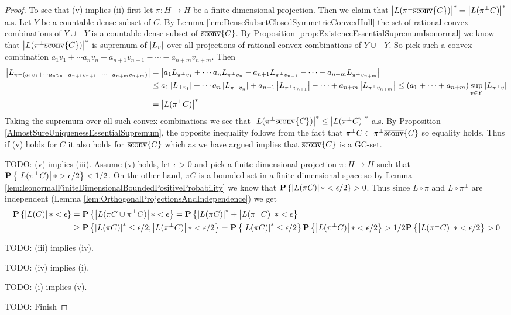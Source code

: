 \begin{proof}
To see that (v) implies (ii) first let $\pi : H \to H$ be a finite dimensional projection.  Then we claim that $\left \vert L(\pi^\perp\overline{\operatorname*{sconv}}\{C\}) \right \vert^* = \left \vert L(\pi^\perp C) \right \vert^*$ a.s.  Let $Y$ be a countable dense subset of $C$.  By Lemma \ref{lem:DenseSubsetClosedSymmetricConvexHull} the set of rational convex combinations of $Y \cup -Y$ is a countable dense subset of $\overline{\operatorname*{sconv}}\{C\}$.  By Proposition \ref{prop:ExistenceEssentialSupremumIsonormal} we know that $\left \vert L(\pi^\perp\overline{\operatorname*{sconv}}\{C\}) \right \vert^*$ is supremum of $\left \vert L_v \right \vert$ over all projections of rational convex combinations of $Y \cup -Y$.  So pick such a convex combination $a_1 v_1 + \dotsb a_n v_n - a_{n+1} v_{n+1} - \dotsb - a_{n+m} v_{n+m}$.  Then 
\begin{align*}
\left \vert L_{\pi^\perp(a_1 v_1 + \dotsb a_n v_n - a_{n+1} v_{n+1} - \dotsb - a_{n+m} v_{n+m})} \right \vert &= \left \vert a_1 L_{\pi^\perp v_1} + \dotsb a_n L_{\pi^\perp v_n} - a_{n+1} L_{\pi^\perp v_{n+1}} - \dotsb - a_{n+m} L_{\pi^\perp v_{n+m}} \right \vert \\
&\leq a_1 \left \vert L_{\perp v_1} \right \vert + \dotsb a_n \left \vert L_{\pi^\perp v_n} \right \vert + a_{n+1} \left \vert L_{\pi^\perp v_{n+1}} \right \vert - \dotsb + a_{n+m} \left \vert L_{\pi^\perp v_{n+m}} \right \vert 
\leq (a_1 + \dotsb + a_{n+m}) \sup_{v \in Y} \left \vert L_{\pi^\perp v} \right \vert \\
&=\left \vert L(\pi^\perp C) \right \vert^*
\end{align*}
Taking the supremum over all such convex combinations we see that $\left \vert L(\pi^\perp\overline{\operatorname*{sconv}}\{C\}) \right \vert^* \leq \left \vert L(\pi^\perp C) \right \vert^*$ a.s.  By Proposition \ref{AlmostSureUniquenessEssentialSupremum}, the opposite inequality follows from the fact that $\pi^\perp C \subset \pi^\perp\overline{\operatorname*{sconv}}\{C\}$ so equality holds.  Thus if (v) holds for $C$ it also holds for $\overline{\operatorname*{sconv}}\{C\}$ which as we have argued implies that $\overline{\operatorname*{sconv}}\{C\}$ is a GC-set.

TODO: (v) implies (iii).  Assume (v) holds, let $\epsilon > 0$  and pick a finite dimensional projection $\pi : H \to H$ such that $\textbf{P}\left \{\left \vert L(\pi^\perp C) \right \vert* > \epsilon/2 \right \} < 1/2$.  On the other hand, $\pi C$ is a bounded set in a finite dimensional space so by Lemma \ref{lem:IsonormalFiniteDimensionalBoundedPositiveProbability} we know that $\textbf{P}\left \{\left \vert L(\pi C) \right \vert* < \epsilon/2 \right \} > 0$.  Thus since $L \circ \pi$ and $L \circ \pi^\perp$ are independent (Lemma \ref{lem:OrthogonalProjectionsAndIndependence}) we get
\begin{align*}
\textbf{P}\left \{\left \vert L(C) \right \vert* < \epsilon \right \} &= \textbf{P}\left \{\left \vert L(\pi C \cup \pi^\perp C) \right \vert* < \epsilon \right \} = \textbf{P}\left \{\left \vert L(\pi C) \right \vert^* + \left \vert L(\pi^\perp C) \right \vert* < \epsilon \right \} \\
&\geq \textbf{P}\left \{\left \vert L(\pi C) \right \vert^* \leq \epsilon/2 ; \left \vert L(\pi^\perp C) \right \vert* < \epsilon/2 \right \} = \textbf{P}\left \{\left \vert L(\pi C) \right \vert^* \leq \epsilon/2 \right \} \textbf{P}\left \{\left \vert L(\pi^\perp C) \right \vert* < \epsilon/2 \right \} > 1/2  \textbf{P}\left \{\left \vert L(\pi^\perp C) \right \vert* < \epsilon/2 \right \} > 0
\end{align*}

TODO: (iii) implies (iv).
 
TODO: (iv) implies (i).
 
TODO: (i) implies (v).
 
TODO: Finish
\end{proof}


